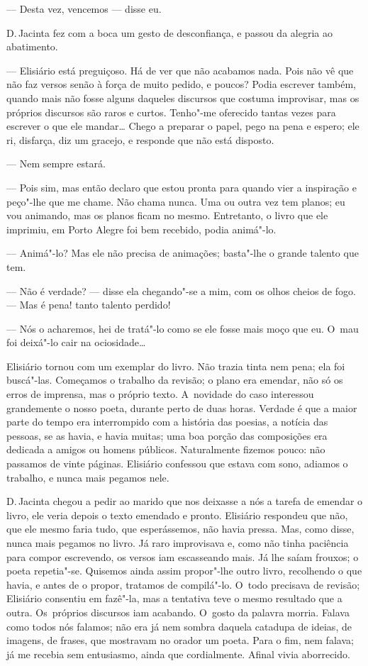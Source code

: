 \begin{linenumbers}
--- Desta vez, vencemos --- disse eu.

D.\,Jacinta fez com a boca um gesto de desconfiança, e passou da alegria
ao abatimento.

--- Elisiário está preguiçoso. Há de ver que não acabamos nada. Pois não
vê que não faz versos senão à força de muito pedido, e poucos? Podia
escrever também, quando mais não fosse alguns daqueles discursos que
costuma improvisar, mas os próprios discursos são raros e curtos.
Tenho"-me oferecido tantas vezes para escrever o que ele mandar\ldots{} Chego
a preparar o papel, pego na pena e espero; ele ri, disfarça, diz um
gracejo, e responde que não está disposto.

--- Nem sempre estará.

--- Pois sim, mas então declaro que estou pronta para quando vier a
inspiração e peço"-lhe que me chame. Não chama nunca. Uma ou outra vez
tem planos; eu vou animando, mas os planos ficam no mesmo. Entretanto, o
livro que ele imprimiu, em Porto Alegre foi bem recebido, podia
animá"-lo.

--- Animá"-lo? Mas ele não precisa de animações; basta"-lhe o grande
talento que tem.

--- Não é verdade? --- disse ela chegando"-se a mim, com os olhos cheios de
fogo. --- Mas é pena! tanto talento perdido!

--- Nós o acharemos, hei de tratá"-lo como se ele fosse mais moço que eu.
O~mau foi deixá"-lo cair na ociosidade\ldots{}

Elisiário tornou com um exemplar do livro. Não trazia tinta nem pena;
ela foi buscá"-las. Começamos o trabalho da revisão; o plano era emendar,
não só os erros de imprensa, mas o próprio texto. A~novidade do caso
interessou grandemente o nosso poeta, durante perto de duas horas.
Verdade é que a maior parte do tempo era interrompido com a história das
poesias, a notícia das pessoas, se as havia, e havia muitas; uma boa
porção das composições era dedicada a amigos ou homens públicos.
Naturalmente fizemos pouco: não passamos de vinte páginas. Elisiário
confessou que estava com sono, adiamos o trabalho, e nunca mais pegamos
nele.

D.\,Jacinta chegou a pedir ao marido que nos deixasse a nós a tarefa de
emendar o livro, ele veria depois o texto emendado e pronto. Elisiário
respondeu que não, que ele mesmo faria tudo, que esperássemos, não havia
pressa. Mas, como disse, nunca mais pegamos no livro. Já raro
improvisava e, como não tinha paciência para compor escrevendo, os
versos iam escasseando mais. Já lhe saíam frouxos; o poeta repetia"-se.
Quisemos ainda assim propor"-lhe outro livro, recolhendo o que havia, e
antes de o propor, tratamos de compilá"-lo. O~todo precisava de revisão;
Elisiário consentiu em fazê"-la, mas a tentativa teve o mesmo resultado
que a outra. Os~próprios discursos iam acabando. O~gosto da palavra
morria. Falava como todos nós falamos; não era já nem sombra daquela
catadupa de ideias, de imagens, de frases, que mostravam no orador um
poeta. Para o fim, nem falava; já me recebia sem entusiasmo, ainda que
cordialmente. Afinal vivia aborrecido.


\end{linenumbers}
